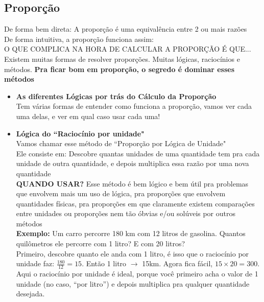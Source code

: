 \documentclass{article}
\begin{document}
\subsection{Proporção}
De forma bem direta: A proporção é uma equivalência entre 2 ou mais razões
\\[5pt]
De forma intuitiva, a proporção funciona assim: 
\\[5pt]
O QUE COMPLICA NA HORA DE CALCULAR A PROPORÇÃO É QUE... Existem muitas formas de resolver proporções. Muitas lógicas, raciocínios e métodos. \textbf{Pra ficar bom em proporção, o segredo é dominar esses métodos}

\begin{itemize}
    \item \textbf{As diferentes Lógicas por trás do Cálculo da Proporção}\\[5pt] Tem várias formas de entender como funciona a proporção, vamos ver cada uma delas, e ver em qual caso usar cada uma! 
    
    \item \textbf{Lógica do ``Raciocínio por unidade"} \\[5pt] Vamos chamar esse método de ``Proporção por Lógica de Unidade"
    \\[5pt]
    Ele consiste em: Descobre quantas unidades de uma quantidade tem pra cada unidade de outra quantidade, e depois multiplica essa razão por uma nova quantidade
    \\[5pt]
    \textbf{QUANDO USAR?} Esse método é bem lógico e bem útil pra problemas que envolvem mais um uso de lógica, pra proporções que envolvem quantidades físicas, pra proporções em que claramente existem comparações entre unidades ou proporções nem tão óbvias e/ou solúveis por outros métodos
    \\[5pt]
    \textbf{Exemplo:} Um carro percorre 180 km com 12 litros de gasolina. Quantos quilômetros ele percorre com 1 litro? E com 20 litros?
    \\[5pt]
    Primeiro, descobre quanto ele anda com 1 litro, é isso que o raciocínio por unidade faz: $\frac{180}{12}=15$. Então 1 litro $\rightarrow$ 15km. Agora fica fácil, $15\times20=300$. Aqui o raciocínio por unidade é ideal, porque você primeiro acha o valor de 1 unidade (no caso, “por litro”) e depois multiplica pra qualquer quantidade desejada.


\end{itemize}
\end{document}
